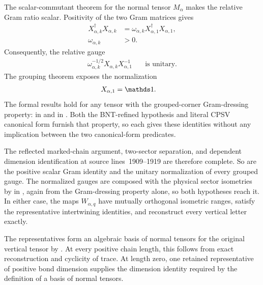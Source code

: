 \documentclass{article}
\begin{document}
The scalar-commutant theorem
 for the normal tensor
$M_\alpha$ makes the relative Gram ratio scalar. Positivity of the two Gram
matrices gives
\begin{align}
    X_{\alpha,k}^\dagger X_{\alpha,k}
     & =\omega_{\alpha,k}
    X_{\alpha,1}^\dagger X_{\alpha,1},
    \label{eq:cpgsv17_vertical_cf_grouping_gram_ratio} \\
    \omega_{\alpha,k}
     & >0.
    \label{eq:cpgsv17_vertical_cf_grouping_positive_gram_scalar}
\end{align}
Consequently, the relative gauge
\begin{align}
    \omega_{\alpha,k}^{-1/2}
    X_{\alpha,k}X_{\alpha,1}^{-1}
     & \quad\text{is unitary}.
    \label{eq:cpgsv17_vertical_cf_grouping_normalized_relative_gauge}
\end{align}
The grouping theorem exposes the normalization
\begin{align}
    X_{\alpha,1}
     & =\Id.
    \label{eq:cpgsv17_vertical_cf_grouping_distinguished_gauge}
\end{align}
The formal results hold for any tensor with the grouped-corner Gram-dressing
property:  in
 and
 in
. Both the
BNT-refined hypothesis and literal CPSV canonical form furnish that property,
so each gives these identities without any implication between the two
canonical-form predicates.

The reflected marked-chain argument, two-sector separation, and dependent
dimension identification at source lines~1909--1919 are therefore complete.
So are the positive scalar Gram identity and the unitary normalization of
every grouped gauge. The normalized gauges are composed with the physical
sector isometries by
 in
, again from the
Gram-dressing property alone, so both hypotheses reach it. In either case, the
maps $W_{\alpha,q}$ have mutually orthogonal isometric ranges,
satisfy the representative intertwining identities, and reconstruct every
vertical letter exactly.

The representatives form an algebraic basis of normal tensors for the original
vertical tensor by
. At every positive chain
length, this follows from exact reconstruction and cyclicity of trace. At
length zero, one retained representative of positive bond dimension supplies
the dimension identity required by the definition of a basis of normal
tensors.
\end{document}
